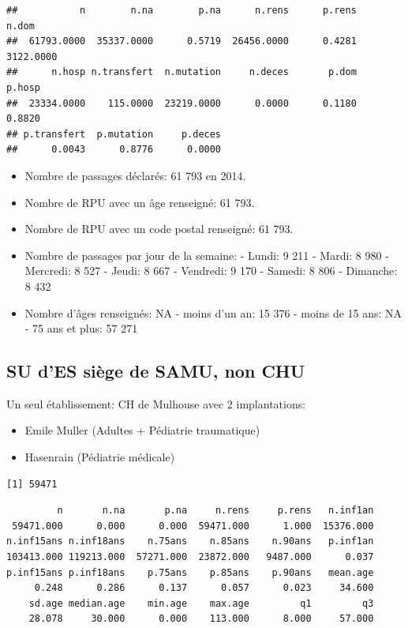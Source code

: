 \documentclass[]{article}
\begin{document}
\begin{verbatim}
##           n        n.na        p.na      n.rens      p.rens       n.dom 
##  61793.0000  35337.0000      0.5719  26456.0000      0.4281   3122.0000 
##      n.hosp n.transfert  n.mutation     n.deces       p.dom      p.hosp 
##  23334.0000    115.0000  23219.0000      0.0000      0.1180      0.8820 
## p.transfert  p.mutation     p.deces 
##      0.0043      0.8776      0.0000
\end{verbatim}

\begin{itemize}
\itemsep1pt\parskip0pt
\item
  Nombre de passages déclarés: 61 793 en 2014.
\item
  Nombre de RPU avec un âge renseigné: 61 793.
\item
  Nombre de RPU avec un code postal renseigné: 61 793.
\item
  Nombre de passages par jour de la semaine: - Lundi: 9 211 - Mardi: 8
  980 - Mercredi: 8 527 - Jeudi: 8 667 - Vendredi: 9 170 - Samedi: 8 806
  - Dimanche: 8 432
\item
  Nombre d'âges renseignés: NA - moins d'un an: 15 376 - moins de 15
  ans: NA - 75 ans et plus: 57 271
\end{itemize}

\subsection{SU d'ES siège de SAMU, non
CHU}\label{su-des-siege-de-samu-non-chu}

Un seul établissement: CH de Mulhouse avec 2 implantations:

\begin{itemize}
\itemsep1pt\parskip0pt
\item
  Emile Muller (Adultes + Pédiatrie traumatique)
\item
  Hasenrain (Pédiatrie médicale)
\end{itemize}

\begin{verbatim}
[1] 59471
\end{verbatim}

\begin{verbatim}
         n       n.na       p.na     n.rens     p.rens   n.inf1an 
 59471.000      0.000      0.000  59471.000      1.000  15376.000 
n.inf15ans n.inf18ans    n.75ans    n.85ans    n.90ans   p.inf1an 
103413.000 119213.000  57271.000  23872.000   9487.000      0.037 
p.inf15ans p.inf18ans    p.75ans    p.85ans    p.90ans   mean.age 
     0.248      0.286      0.137      0.057      0.023     34.600 
    sd.age median.age    min.age    max.age         q1         q3 
    28.078     30.000      0.000    113.000      8.000     57.000 
\end{verbatim}
\end{document}
